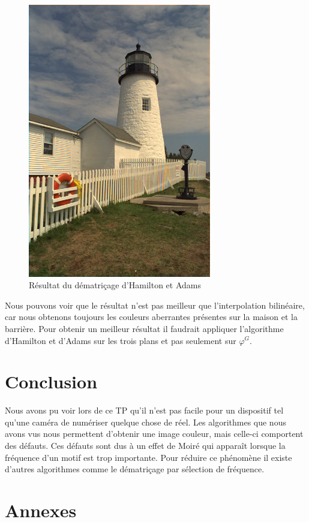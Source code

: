 \documentclass[a4paper,11pt]{article}
\begin{document}
  \begin{figure}[H]
  \center
   \includegraphics[width=8cm]{../result3.png}
   \caption{Résultat du dématriçage d'Hamilton et Adams}
  \end{figure}
  
  Nous pouvons voir que le résultat n'est pas meilleur que l'interpolation bilinéaire, car nous obtenons toujours 
  les couleurs aberrantes présentes sur la maison et la barrière. Pour obtenir un meilleur résultat il faudrait
  appliquer l'algorithme d'Hamilton et d'Adams sur les trois plans et pas seulement sur $\varphi^G$.
  
  \section{Conclusion}
  Nous avons pu voir lors de ce TP qu'il n'est pas facile pour un dispositif tel qu'une caméra de numériser 
  quelque chose de réel. Les algorithmes que nous avons vus nous permettent d'obtenir une image couleur, mais celle-ci comportent des 
  défauts. Ces défauts sont dus à un effet de Moiré qui apparaît lorsque la fréquence d'un motif est trop importante.
  Pour réduire ce phénomène il existe d'autres algorithmes comme le dématriçage par sélection de fréquence.
  \newpage
 
  \section{Annexes}
  
\end{document}
